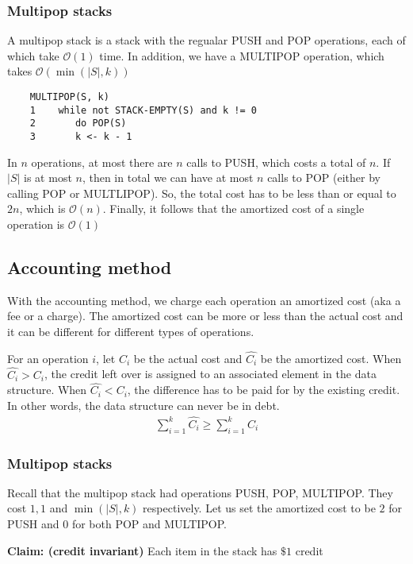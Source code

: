 \documentclass[11pt]{article}
\begin{document}
\subsubsection{Multipop stacks}
A multipop stack is a stack with the regualar PUSH and POP operations, each of which take $\mathcal{O}(1)$ time. In addition, we have a MULTIPOP operation, which takes $\mathcal{O}(\min(|S|, k))$

\begin{verbatim}
    MULTIPOP(S, k)
    1    while not STACK-EMPTY(S) and k != 0 
    2       do POP(S)
    3       k <- k - 1
\end{verbatim}

In $n$ operations, at most there are $n$ calls to PUSH, which costs a total of $n$. If $|S|$ is at most $n$, then in total we can have at most $n$ calls to POP (either by calling POP or MULTLIPOP). So, the total cost has to be less than or equal to $2n$, which is $\mathcal{O}(n)$. Finally, it follows that the amortized cost of a single operation is $\mathcal{O}(1)$

\subsection{Accounting method}
With the accounting method, we charge each operation an amortized cost (aka a fee or a charge). The amortized cost can be more or less than the actual cost and it can be different for different types of operations. 

For an operation $i$, let $C_i$ be the actual cost and $\hat{C_i}$ be the amortized cost. When $\hat{C_i} > C_i$, the credit left over is assigned to an associated element in the data structure. When $\hat{C_i} < C_i$, the difference has to be paid for by the existing credit. In other words, the data structure can never be in debt. 
\begin{align*}
    \sum_{i=1}^k \hat{C_i} \geq \sum_{i=1}^k C_i \tag{$\forall k$}
\end{align*}

\subsubsection{Multipop stacks} 
Recall that the multipop stack had operations PUSH, POP, MULTIPOP. They cost $1, 1$ and $\min(|S|, k)$ respectively. Let us set the amortized cost to be $2$ for PUSH and $0$ for both POP and MULTIPOP. 

\textbf{Claim: (credit invariant)} Each item in the stack has $\$ 1$ credit
\end{document}
